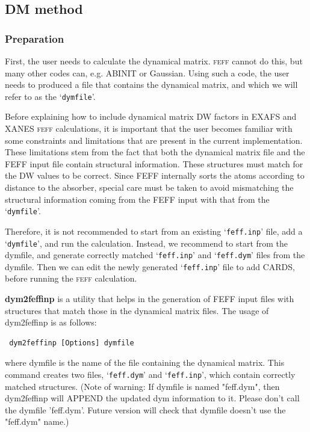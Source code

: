 \documentclass[11pt,oneside]{report} %
\newcommand{\program}[1]{\textsc{#1}}
\newcommand{\feff}{\program{feff}}
\newcommand{\file}[1]{`\texttt{#1}'}
\begin{document}
\subsection{DM method}

\subsubsection{Preparation}

First, the user needs to calculate the dynamical matrix.  {\feff} cannot do this, but many other codes can, e.g. ABINIT or Gaussian.  Using such a code, the user needs to produced a file that contains the dynamical matrix, and which we will refer to as the \file{dymfile}.

Before explaining how to include dynamical matrix DW factors in EXAFS and XANES
{\feff} calculations, it is important that the user becomes familiar with some
constraints and limitations that are present in the current implementation. These
limitations stem from the fact that both the dynamical matrix file and the FEFF input
file contain structural information. These structures must match for the DW
values to be correct. Since FEFF internally sorts the atoms according to
distance to the absorber, special care must be taken to avoid mismatching the
structural information coming from the FEFF input with that from the \file{dymfile}.

Therefore, it is not recommended to start from an existing \file{feff.inp} file, add a \file{dymfile}, and run the calculation.
Instead, we recommend to start from the dymfile, and generate correctly matched \file{feff.inp} and \file{feff.dym} files from the dymfile.  Then we can edit the newly generated \file{feff.inp} file to add CARDS, before running the {\feff} calculation.

\textbf{dym2feffinp} is a utility that helps in the generation of FEFF input files with
structures that match those in the dynamical matrix files. The usage of
dym2feffinp is as follows:

\begin{verbatim} dym2feffinp [Options] dymfile
\end{verbatim}

where dymfile is the name of the file containing the dynamical matrix. This
command creates two files, \file{feff.dym} and \file{feff.inp}, which contain correctly
matched structures. (Note of warning: If dymfile is named "feff.dym", then
dym2feffinp will APPEND the updated dym information to it. Please don't call the dymfile 'feff.dym'. Future version will check that dymfile
doesn't use the "feff.dym" name.)
\end{document}
